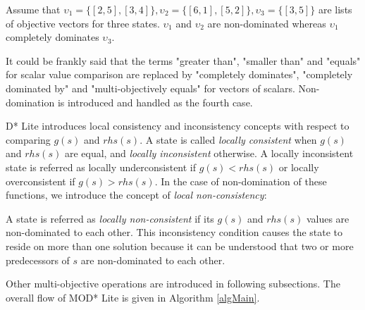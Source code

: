 Assume that $\upsilon_{1}=\{[2,5],[3,4]\}, \upsilon_{2}=\{[6,1],[5,2]\}, \upsilon_{3}=\{[3,5]\}$ are lists of objective vectors for three states. $\upsilon_{1}$ and $\upsilon_{2}$ are non-dominated whereas $\upsilon_{1}$ completely dominates $\upsilon_{3}$. 

It could be frankly said that the terms "greater than", "smaller than" and "equals" for scalar value comparison are replaced by "completely dominates", "completely dominated by" and "multi-objectively equals" for vectors of scalars. Non-domination is introduced and handled as the fourth case.

D* Lite introduces local consistency and inconsistency concepts with respect to comparing $g(s)$ and $rhs(s)$. A state is called {\it locally consistent} when $g(s)$ and $rhs(s)$ are equal, and {\it locally inconsistent} otherwise. A locally inconsistent state is referred as locally underconsistent if $g(s)<rhs(s)$ or locally overconsistent if $g(s)>rhs(s)$. In the case of non-domination of these functions, we introduce the concept of {\it local non-consistency}:

\begin{definition}
A state is referred as \textit{locally non-consistent} if its $g(s)$ and $rhs(s)$ values are non-dominated to each other. This inconsistency condition causes the state to reside on more than one solution because it can be understood that two or more predecessors of $s$ are non-dominated to each other.
\end{definition}

Other multi-objective operations are introduced in following subsections. The overall flow of MOD* Lite is given in Algorithm \ref{algMain}.

